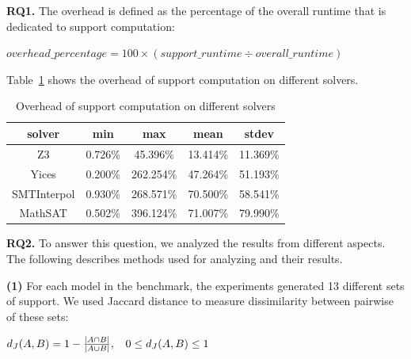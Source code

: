 \textbf{RQ1.} The overhead is defined as the percentage of the overall runtime that is dedicated to support computation:

\mbox{$overhead\_percentage = 100 \times (support\_runtime \div overall\_runtime)$}

 Table~\ref{tab:overhead} shows the overhead of support computation on different solvers.


\begin{table}
  \centering
  \begin{tabular}{ |c||c|c|c|c| }
    \hline
     solver & min & max & mean & stdev \\[0.5ex]
    \hline
    Z3   & 0.726\% & 45.396\% & 13.414\% & 11.369\% \\[0.5ex]
    Yices &   0.200\%  & 262.254\%   & 47.264\% & 51.193\% \\[0.5ex]
    SMTInterpol& 0.930\% & 268.571\% &  70.500\% & 58.541\%\\[0.5ex]
    MathSAT & 0.502\% & 396.124\% &  71.007\% & 79.990\%\\[0.5ex]
    \hline
  \end{tabular}
  \caption{\small{Overhead of support computation on different solvers}}
  \label{tab:overhead}
\end{table}

\vspace{6pt}
\noindent{}
 \vspace{9pt}

\textbf{RQ2.} To answer this question, we analyzed the results from different aspects. The following describes methods used for analyzing and their results.

\textbf{(1)} For each model in the benchmark, the experiments generated 13 different sets of support. We used Jaccard distance to measure dissimilarity between pairwise of these sets:

\begin{center}
$d_J(\small{A}, \small{B}) = 1 - \frac{|A \cap B|}{|A \cup B|} ,\hspace{9pt} 0 \leq d_J(\small{A}, \small{B}) \leq 1$
\end{center}
\vspace{6pt}

